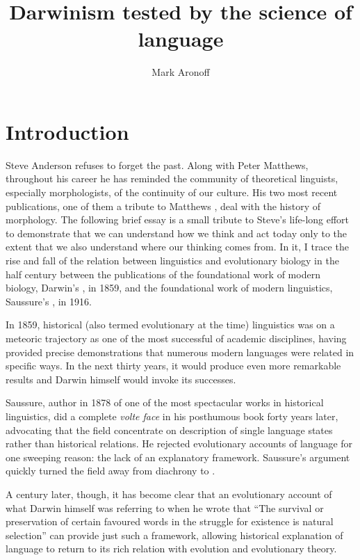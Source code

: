 \documentclass[output=paper,
modfonts
]{LSP/langsci}
\title{Darwinism tested by the science of language}
\author{%
Mark Aronoff\affiliation{Stony Brook University}
}
\begin{document}
\maketitle


\section{Introduction}

Steve Anderson refuses to forget the past.  Along with Peter Matthews, throughout his career he has reminded the community of theoretical linguists, especially morphologists, of the continuity of our culture.  His two most recent publications, one of them a tribute to Matthews \citep{andersontoappeara,andersontoappearb}, deal with the history of morphology. The following brief essay is a small tribute to Steve's life-long effort to demonstrate that we can understand how we think and act today only to the extent that we also understand where our thinking comes from. In it, I trace the rise and fall of the relation between linguistics and evolutionary biology in the half century between the publications of the foundational work of modern biology, Darwin's , in 1859, and the foundational work of modern linguistics, Saussure's , in 1916.

In 1859, historical (also termed evolutionary at the time) linguistics was on a meteoric trajectory as one of the most successful of academic disciplines, having provided precise demonstrations that numerous modern languages were related in specific ways. In the next thirty years, it would produce even more remarkable results and {Darwin} himself would invoke its successes.

Saussure, author in 1878 of one of the most spectacular works in historical linguistics, did a complete \textit{volte face} in his posthumous book forty years later, advocating that the field concentrate on description  of single language states rather than historical relations. He rejected evolutionary accounts of language for one sweeping reason: the lack of an explanatory framework. Saussure's argument quickly turned the field away from diachrony to .

A century later, though, it has become clear that an evolutionary account of what Darwin himself was referring to when he wrote that ``The survival or preservation of certain favoured words in the struggle for existence is natural selection'' \citep[61]{Darwin1871} can provide just such a framework, allowing historical explanation of language to return to its rich relation with evolution and evolutionary theory.
\end{document}
